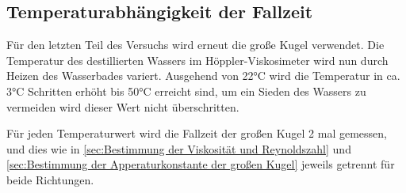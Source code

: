 \subsection{Temperaturabhängigkeit der Fallzeit}
\label{sec:Temperaturabhängigkeit der Fallzeit}
Für den letzten Teil des Versuchs wird erneut die große Kugel verwendet.
Die Temperatur des destillierten Wassers im Höppler-Viskosimeter wird nun durch Heizen des Wasserbades variert.
Ausgehend von 22°C wird die Temperatur in ca. 3°C Schritten erhöht bis 50°C erreicht sind, um ein Sieden des
Wassers zu vermeiden wird dieser Wert nicht überschritten.

Für jeden Temperaturwert wird die Fallzeit der großen Kugel 2 mal gemessen,
und dies wie in \autoref{sec:Bestimmung der Viskosität und Reynoldszahl}
und \autoref{sec:Bestimmung der Apperaturkonstante der großen Kugel} jeweils getrennt für beide Richtungen.